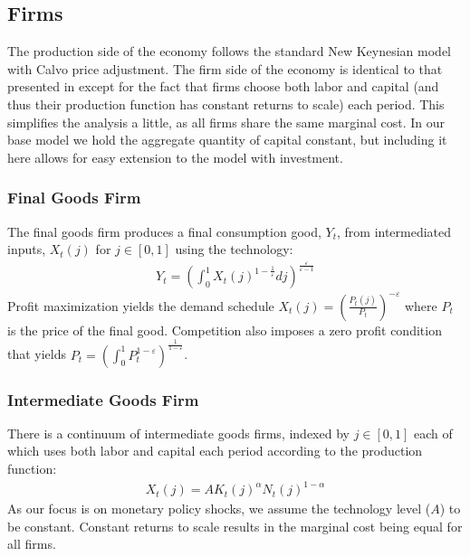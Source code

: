 \documentclass[titlepage]{\econtex}\newcommand{\texname}{ConsumptionHeterogeneity}
\begin{document}
\subsection {Firms}
The production side of the economy follows the standard New Keynesian model with Calvo price adjustment. The firm side of the economy is identical to that presented in \cite{gali_book} except for the fact that firms choose both labor and capital (and thus their production function has constant returns to scale) each period. This simplifies the analysis a little, as all firms share the same marginal cost. In our base model we hold the aggregate quantity of capital constant, but including it here allows for easy extension to the model with investment.

\subsubsection{Final Goods Firm}
The final goods firm produces a final consumption good, $Y_t$, from intermediated inputs, $X_t(j)$ for $j \in [0,1]$ using the technology:
\begin{align*}
Y_t = \left( \int_0^1 X_t(j)^{1-\frac{1}{\varepsilon}} dj \right)^{\frac{\varepsilon}{\varepsilon-1}}
\end{align*}
Profit maximization yields the demand schedule $X_t(j) = \left(\frac{P_t(j)}{P_t}\right)^{-\varepsilon}$ where $P_t$ is the price of the final good. Competition also imposes a zero profit condition that yields $P_t = \left(\int_0^1 P_t^{1-\varepsilon}\right)^{\frac{1}{1-\varepsilon}}$.

\subsubsection{Intermediate Goods Firm}
There is a continuum of intermediate goods firms, indexed by $j \in [0,1]$ each of which uses both labor and capital each period according to the production function:
\begin{align*}
X_t(j) = A K_t(j)^\alpha N_t(j)^{1-\alpha}
\end{align*}
As our focus is on monetary policy shocks, we assume the technology level ($A$) to be constant. Constant returns to scale results in the marginal cost being equal for all firms.
\end{document}
